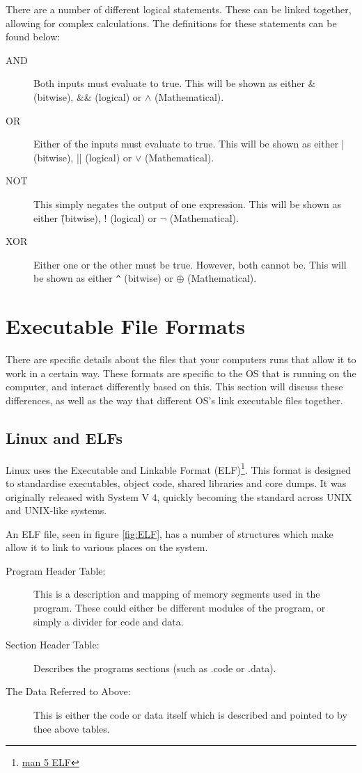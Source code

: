		There are a number of different logical statements. 
		These can be linked together, allowing for complex calculations. 
		The definitions for these statements can be found below:
			\begin{description}
				\item[AND] Both inputs must evaluate to true. 
					This will be shown as either \& (bitwise), \&\& (logical) or $\wedge$ (Mathematical).
				\item[OR] Either of the inputs must evaluate to true. 
					This will be shown as either | (bitwise), || (logical) or $\vee$ (Mathematical). 
				\item[NOT] This simply negates the output of one expression.
					This will be shown as either \~ (bitwise), ! (logical) or $\neg$ (Mathematical).
				\item[XOR] Either one or the other must be true. However, both cannot be. 
				This will be shown as either \verb+^+ (bitwise) or $\oplus$ (Mathematical).
			\end{description}
	
	\section{Executable File Formats}
		There are specific details about the files that your computers runs that allow it to work in a certain way. 
		These formats are specific to the OS that is running on the computer, 
		and interact differently based on this. 
		This section will discuss these differences, as well as the way that different OS's link executable files together. 

		\subsection{Linux and ELFs}
			Linux uses the Executable and Linkable Format (ELF)\footnote{\href{http://linux.die.net/man/5/elf}{man 5 ELF}}. 
			This format is designed to standardise executables, object code, shared libraries and core dumps. 
			It was originally released with System V 4, quickly becoming the standard across UNIX and UNIX-like systems. 

			An ELF file, seen in figure \ref{fig:ELF}, has a number of structures which make allow it to link to various places on the system. 
			\begin{description}
				\item[Program Header Table:] This is a description and mapping of memory segments used in the program. 
					These could either be different modules of the program, or simply a divider for code and data. 
				\item[Section Header Table:] Describes the programs sections (such as .code or .data).
				\item[The Data Referred to Above:] This is either the code or data itself which is described 
					and pointed to by thee above tables. 
			\end{description}


